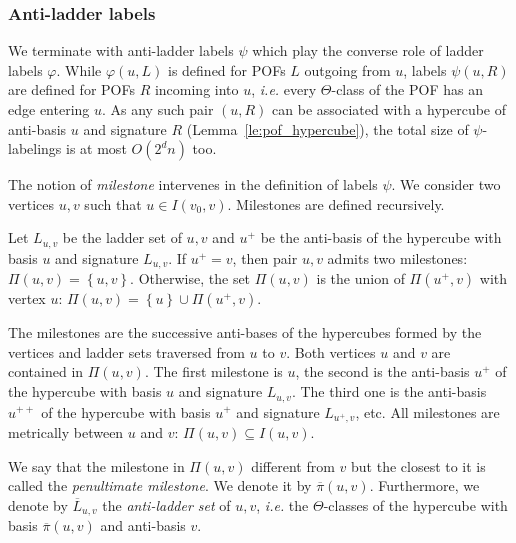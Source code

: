 \documentclass[a4paper,UKenglish,numberwithinsect,cleveref, autoref]{lipics-v2021}
\newcommand{\set}[1]{\left\{ #1 \right\}}
\begin{document}
\subsubsection{Anti-ladder labels} \label{subsubsec:anti_ladder}

We terminate with anti-ladder labels $\psi$ which play the converse role of ladder labels $\varphi$. While $\varphi(u,L)$ is defined for POFs $L$ outgoing from $u$, labels $\psi(u,R)$ are defined for POFs $R$ incoming into $u$, {\em i.e.} every $\Theta$-class of the POF has an edge entering $u$. As any such pair $(u,R)$ can be associated with a hypercube of anti-basis $u$ and signature $R$ (Lemma~\ref{le:pof_hypercube}), the total size of $\psi$-labelings is at most $O(2^dn)$ too.

The notion of \textit{milestone} intervenes in the definition of labels $\psi$. We consider two vertices $u,v$ such that $u \in I(v_0,v)$. Milestones are defined recursively.

\begin{definition}[Milestones $\Pi(u,v)$]
Let $L_{u,v}$ be the ladder set of $u,v$ and $u^+$ be the anti-basis of the hypercube with basis $u$ and signature $L_{u,v}$.
If $u^+ = v$, then pair $u,v$ admits two milestones: $\Pi(u,v) = \set{u,v}$. Otherwise, the set $\Pi(u,v)$ is the union of $\Pi(u^+,v)$ with vertex $u$: $\Pi(u,v) = \set{u} \cup \Pi(u^+,v)$.
\label{def:milestones}
\end{definition}

The milestones are the successive anti-bases of the hypercubes formed by the vertices and ladder sets traversed from $u$ to $v$. Both vertices $u$ and $v$ are contained in $\Pi(u,v)$. The first milestone is $u$, the second is the anti-basis $u^+$ of the hypercube with basis $u$ and signature $L_{u,v}$. The third one is the anti-basis $u^{++}$ of the hypercube with basis $u^+$ and signature $L_{u^+,v}$, etc. All milestones are metrically between $u$ and $v$: $\Pi(u,v) \subseteq I(u,v)$. 

\begin{definition}
We say that the milestone in $\Pi(u,v)$ different from $v$ but the closest to it is called the \textit{penultimate milestone}. We denote it by $\overline{\pi}(u,v)$. Furthermore, we denote by $\overline{L}_{u,v}$ the \emph{anti-ladder set} of $u,v$, {\em i.e.} the $\Theta$-classes of the hypercube with basis $\overline{\pi}(u,v)$ and anti-basis $v$. 
\end{definition}
\end{document}
